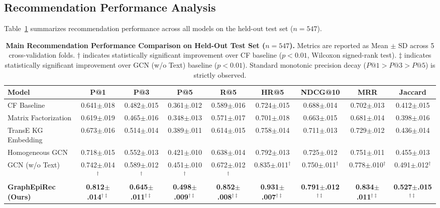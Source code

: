 \documentclass[11pt,a4paper]{article}
\begin{document}
\subsection{Recommendation Performance Analysis}

Table~\ref{tab:main_results} summarizes recommendation performance across all models on the held-out test set ($n=547$). 

\begin{table}[t]
\centering
\caption{\textbf{Main Recommendation Performance Comparison on Held-Out Test Set ($n=547$).} Metrics are reported as Mean $\pm$ SD across 5 cross-validation folds. $\dagger$ indicates statistically significant improvement over CF baseline ($p < 0.01$, Wilcoxon signed-rank test). $\ddagger$ indicates statistically significant improvement over GCN (w/o Text) baseline ($p < 0.01$). Standard monotonic precision decay ($P@1 > P@3 > P@5$) is strictly observed.}
\label{tab:main_results}
\small
\begin{tabular}{lcccccccc}
\toprule
\textbf{Model} & \textbf{P@1} & \textbf{P@3} & \textbf{P@5} & \textbf{R@5} & \textbf{HR@5} & \textbf{NDCG@10} & \textbf{MRR} & \textbf{Jaccard} \\
\midrule
CF Baseline & 0.641$\pm$.018 & 0.482$\pm$.015 & 0.361$\pm$.012 & 0.589$\pm$.016 & 0.724$\pm$.015 & 0.688$\pm$.014 & 0.702$\pm$.013 & 0.412$\pm$.015 \\
Matrix Factorization & 0.619$\pm$.019 & 0.465$\pm$.016 & 0.348$\pm$.013 & 0.571$\pm$.017 & 0.701$\pm$.018 & 0.663$\pm$.015 & 0.681$\pm$.014 & 0.398$\pm$.016 \\
TransE KG Embedding & 0.673$\pm$.016 & 0.514$\pm$.014 & 0.389$\pm$.011 & 0.614$\pm$.015 & 0.758$\pm$.014 & 0.711$\pm$.013 & 0.729$\pm$.012 & 0.436$\pm$.014 \\
Homogeneous GCN & 0.718$\pm$.015 & 0.552$\pm$.013 & 0.421$\pm$.010 & 0.638$\pm$.014 & 0.792$\pm$.013 & 0.725$\pm$.012 & 0.751$\pm$.011 & 0.455$\pm$.013 \\
GCN (w/o Text) & 0.742$\pm$.014$^\dagger$ & 0.589$\pm$.012$^\dagger$ & 0.451$\pm$.010$^\dagger$ & 0.672$\pm$.012$^\dagger$ & 0.835$\pm$.011$^\dagger$ & 0.750$\pm$.011$^\dagger$ & 0.778$\pm$.010$^\dagger$ & 0.491$\pm$.012$^\dagger$ \\
\midrule
\textbf{GraphEpiRec (Ours)} & \textbf{0.812$\pm$.014}$^{\dagger\ddagger}$ & \textbf{0.645$\pm$.011}$^{\dagger\ddagger}$ & \textbf{0.498$\pm$.009}$^{\dagger\ddagger}$ & \textbf{0.852$\pm$.008}$^{\dagger\ddagger}$ & \textbf{0.931$\pm$.007}$^{\dagger\ddagger}$ & \textbf{0.791$\pm$.012}$^{\dagger\ddagger}$ & \textbf{0.834$\pm$.011}$^{\dagger\ddagger}$ & \textbf{0.527$\pm$.015}$^{\dagger\ddagger}$ \\
\bottomrule
\end{tabular}
\end{table}
\end{document}
